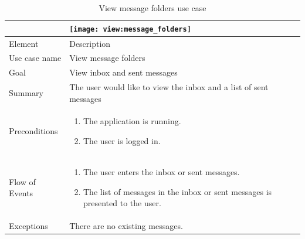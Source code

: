\begin{table}
\begin{tabular}{p{3cm}p{12cm}}
& \texttt{[image: view:message\_folders]}\\ \hline
Element & Description \\ \hline
Use case name & View message folders \\
Goal & View inbox and sent messages \\
Summary &The user would like to view the inbox and a list of sent messages \\
Preconditions &
\begin{enumerate}
\item{}The application is running.
\item{}The user is logged in.
\end{enumerate} \\ \hline
Flow of Events &
\begin{enumerate}
\item{}The user enters the inbox or sent messages.
\item{}The list of messages in the inbox or sent messages is presented to the user.
\end{enumerate} \\ \hline
Exceptions & There are no existing messages.
\end{tabular}
\caption{View message folders use case} \label{tab:viewmessages}
\end{table}

